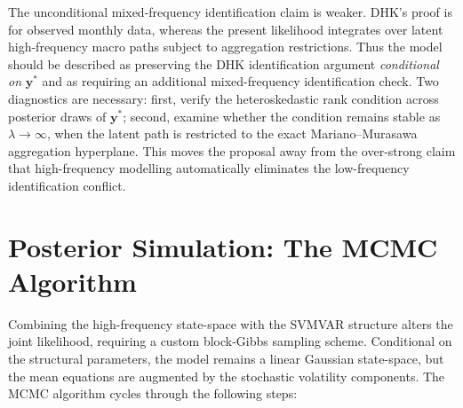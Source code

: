 \documentclass[12pt]{article}
\begin{document}
The unconditional mixed-frequency identification claim is weaker. DHK's proof is for observed monthly data, whereas the present likelihood integrates over latent high-frequency macro paths subject to aggregation restrictions. Thus the model should be described as preserving the DHK identification argument \emph{conditional on} $\mathbf{y}^*$ and as requiring an additional mixed-frequency identification check. Two diagnostics are necessary: first, verify the heteroskedastic rank condition across posterior draws of $\mathbf{y}^*$; second, examine whether the condition remains stable as $\lambda\rightarrow\infty$, when the latent path is restricted to the exact Mariano--Murasawa aggregation hyperplane. This moves the proposal away from the over-strong claim that high-frequency modelling automatically eliminates the low-frequency identification conflict.

\section{Posterior Simulation: The MCMC Algorithm}
Combining the high-frequency state-space with the SVMVAR structure alters the joint likelihood, requiring a custom block-Gibbs sampling scheme. Conditional on the structural parameters, the model remains a linear Gaussian state-space, but the mean equations are augmented by the stochastic volatility components. The MCMC algorithm cycles through the following steps:
\end{document}
